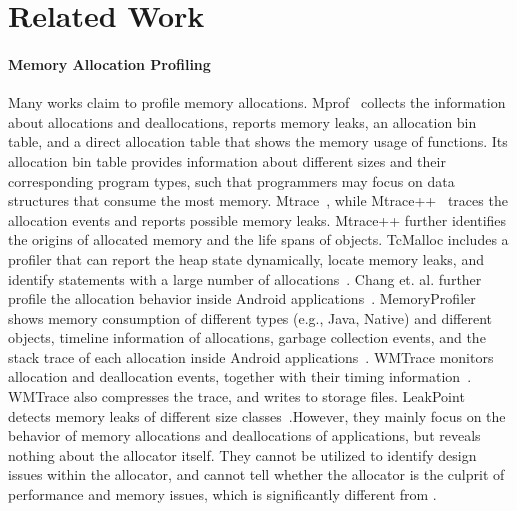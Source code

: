\section{Related Work}
\label{sec:relatedwork}

\paragraph{Memory Allocation Profiling} Many works claim to profile memory allocations. Mprof~\cite{Zorn:1988:MAP:894814} collects the information about allocations and deallocations, reports memory leaks, an allocation bin table, and a direct allocation table that shows the memory usage of functions. Its allocation bin table provides information about different sizes and their corresponding program types, such that programmers may focus on data structures that consume the most memory. Mtrace~\cite{mtrace}, while Mtrace++~\cite{Lee:2000:DMM:786772.787150} traces the allocation events and  reports possible memory leaks. Mtrace++ further identifies the origins of allocated memory and the life spans of objects. TcMalloc includes a profiler that can report the heap state dynamically, locate memory leaks, and identify statements with a large number of allocations~\cite{tcmalloc}. Chang et. al. further profile the allocation behavior inside Android applications~\cite{7031343}. MemoryProfiler shows memory consumption of different types (e.g., Java, Native) and different objects, timeline information of allocations, garbage collection events, and the stack trace of each allocation inside Android applications~\cite{MemoryProfiler}. WMTrace monitors allocation and deallocation events, together with their timing information~\cite{Perks:2011:WAP:2186355.2186369}. WMTrace also compresses the trace, and writes to storage files. LeakPoint detects memory leaks of different size classes~\cite{Clause:2010:LPC:1806799.1806874}.However, they mainly focus on the behavior of memory allocations and deallocations of applications, but reveals nothing about the allocator itself. They cannot be utilized to identify design issues within the allocator, and cannot tell whether the allocator is the culprit of performance and memory issues, which is significantly different from \MP{}. 

